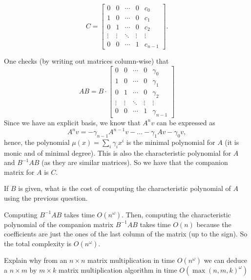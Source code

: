 \documentclass[11pt]{exam}
\theoremstyle{definition}
\begin{document}
{\begin{questions}
	\[ C =
	\begin{bmatrix}
	0 & 0 & \cdots & 0 & c_0 \\
	1 & 0 & \cdots & 0 & c_1 \\
	0 & 1 & \cdots & 0 & c_2 \\
	\vdots & \vdots & \ddots & \vdots & \vdots \\
	0 & 0 & \cdots & 1 & c_{n-1}
	\end{bmatrix}.
	\]
	\begin{solution}
		One checks (by writing out matrices column-wise) that 
		\[
		 AB = B \cdot
		 \begin{bmatrix}
		 	0 & 0 & \cdots & 0 & \gamma_0 \\
		 1 & 0 & \cdots & 0 &  \gamma_1 \\
		 0 & 1 & \cdots & 0 &  \gamma_2 \\
		 \vdots & \vdots & \ddots & \vdots & \vdots \\
		 0 & 0 & \cdots & 1 &  \gamma_{n-1}
		 \end{bmatrix}
		\] 
		Since we have an explicit basis, we know that $A^n v$ can be expressed as 
		\[
			A^n v = -\gamma_{n-1} A^{n-1}v - \ldots -\gamma_1 Av - \gamma_0 v,
		\]
		hence, the polynomial $\mu(x) = \sum_i \gamma_i x^i$ is the minimal polynomial for $A$ (it is monic and of minimal degree). This is also the characteristic polynomial for $A$ and $B^{-1}AB$ (as they are similar matrices). So we have that the companion matrix for $A$ is $C$.
	\end{solution}
	
	\question 
	\label{qu:2} 
	If $B$ is given, what is the cost of computing the characteristic polynomial of $A$ using the previous question.
	
	\begin{solution}
		Computing $B^{-1}AB$ takes time $O(n^\omega)$. Then, computing the characteristic polynomial of the companion matrix $B^{-1}AB$ takes time $O(n)$ because the coefficients are just the ones of the last column of the matrix (up to the sign). So the total complexity is $O(n^\omega)$.
	\end{solution}
	
	\question Explain why from an $n\times n$ matrix multiplication in time $O(n^\omega)$ we
	can deduce a $n\times m$ by $m\times k$ matrix multiplication algorithm in time
	$O(\max(n,m,k)^\omega)$
	

\end{questions}}
\end{document}
